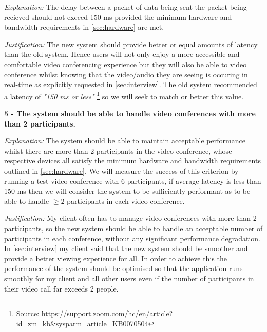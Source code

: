 \vspace{0.1cm}

\textit{Explanation:}
The delay between a packet of data being sent the packet 
being recieved should not exceed 150 ms provided the minimum
hardware and bandwidth requirements in \ref{sec:hardware} 
are met.

\vspace{0.1cm}

\textit{Justification:}
The new system should provide better or equal amounts of 
latency than the old system. Hence users will not only enjoy
a more accessible and comfortable video conferencing 
experience but they will also be able to video conference 
whilst knowing that the video/audio they are seeing is
occuring in real-time as explicitly requested in 
\ref{sec:interview}. The old system recommended a latency of
\textit{"150 ms or less"} \footnote{Source:
\url{https://support.zoom.com/hc/en/article?id=zm_kb&sysparm_article=KB0070504}} 
so we will seek to match or better this value.

\vspace{0.2cm}

\textsf{\bfseries 5 - The system should be able to handle video 
conferences with more than 2 participants.}

\vspace{0.1cm}

\textit{Explanation:}
The system should be able to maintain acceptable performance
whilst there are more than 2 participants in the video 
conference, whose respective devices all satisfy the minimum
hardware and bandwidth requirements outlined in 
\ref{sec:hardware}. We will measure the success of this 
criterion by running a test video conference with 6 
participants, if average latency is less than 150 ms then we
will consider the system to be sufficiently performant as to 
be able to handle $\geq 2$ participants in each video
conference.
\vspace{0.1cm}

\textit{Justification:}
My client often has to manage video conferences with more than
2 participants, so the new system should be able to handle an 
acceptable number of participants in each conference, without
any significant performance degradation. In
\ref{sec:interview} my client said that the new system should 
be smoother and provide a better viewing experience for all.
In order to achieve this the performance of the system should
be optimised so that the application runs smoothly for my 
client and all other users even if the number of participants
in their video call far exceeds 2 people.
